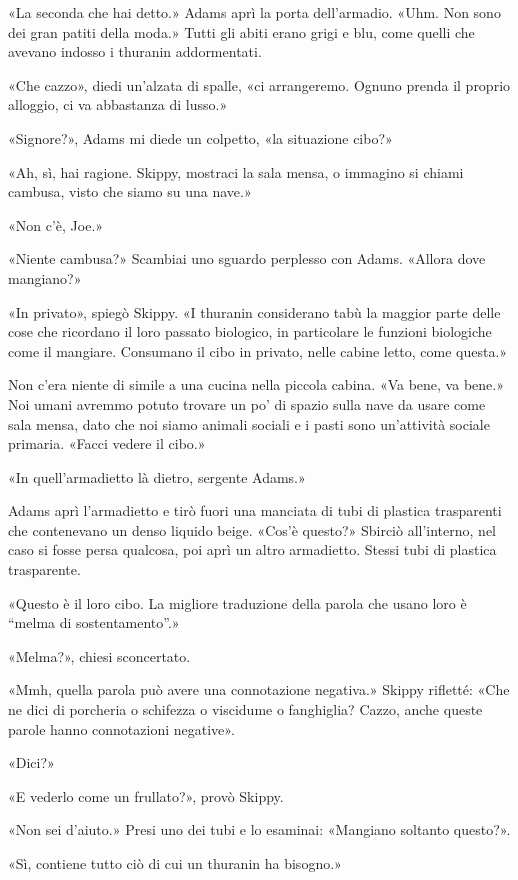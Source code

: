 «La seconda che hai detto.» Adams aprì la porta dell'armadio. «Uhm. Non
sono dei gran patiti della moda.» Tutti gli abiti erano grigi e blu,
come quelli che avevano indosso i thuranin addormentati.

«Che cazzo», diedi un'alzata di spalle, «ci arrangeremo. Ognuno prenda
il proprio alloggio, ci va abbastanza di lusso.»

«Signore?», Adams mi diede un colpetto, «la situazione cibo?»

«Ah, sì, hai ragione. Skippy, mostraci la sala mensa, o immagino si
chiami cambusa, visto che siamo su una nave.»

«Non c'è, Joe.»

«Niente cambusa?» Scambiai uno sguardo perplesso con Adams. «Allora dove
mangiano?»

«In privato», spiegò Skippy. «I thuranin considerano tabù la maggior
parte delle cose che ricordano il loro passato biologico, in particolare
le funzioni biologiche come il mangiare. Consumano il cibo in privato,
nelle cabine letto, come questa.»

Non c'era niente di simile a una cucina nella piccola cabina. «Va bene,
va bene.» Noi umani avremmo potuto trovare un po' di spazio sulla nave
da usare come sala mensa, dato che noi siamo animali sociali e i pasti
sono un'attività sociale primaria. «Facci vedere il cibo.»

«In quell'armadietto là dietro, sergente Adams.»

Adams aprì l'armadietto e tirò fuori una manciata di tubi di plastica
trasparenti che contenevano un denso liquido beige. «Cos'è questo?»
Sbirciò all'interno, nel caso si fosse persa qualcosa, poi aprì un altro
armadietto. Stessi tubi di plastica trasparente.

«Questo è il loro cibo. La migliore traduzione della parola che usano
loro è ``melma di sostentamento''.»

«Melma?», chiesi sconcertato.

«Mmh, quella parola può avere una connotazione negativa.» Skippy
rifletté: «Che ne dici di porcheria o schifezza o viscidume o
fanghiglia? Cazzo, anche queste parole hanno connotazioni negative».

«Dici?»

«E vederlo come un frullato?», provò Skippy.

«Non sei d'aiuto.» Presi uno dei tubi e lo esaminai: «Mangiano soltanto
questo?».

«Sì, contiene tutto ciò di cui un thuranin ha bisogno.»


